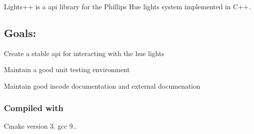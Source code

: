 Lights++ is a api library for the Phillips Hue lights system implemented in C++.

\subsection*{Goals\+:}


\begin{DoxyItemize}
\item Create a stable api for interacting with the hue lights
\item Maintain a good unit testing environment
\item Maintain good incode documentation and external documenation
\end{DoxyItemize}

\subsubsection*{Compiled with}

Cmake version 3. gcc 9.. 